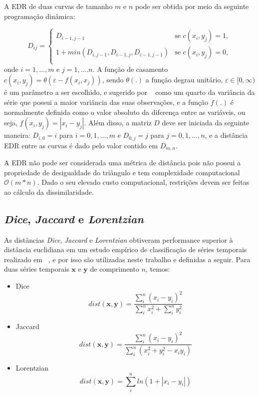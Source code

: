 A EDR de duas curvas de tamanho $m$ e $n$ pode ser obtida por meio da seguinte programação dinâmica:

\begin{equation}
D_{ij} = 
\begin{cases} 
D_{i-1,j-1} 											   & \text{se } c(x_i,y_j) = 1, \\
1 + min(D_{i,j-1},D_{i-1,j},D_{i-1,j-1})     & \text{se } c(x_i,y_j) = 0, \\
\end{cases}
\end{equation}
onde $i=1,...,m$ e $j=1,....n$. A função de casamento $c(x_i,y_j) = \theta (\varepsilon - f(x_i,x_j))$, sendo $\theta(.)$ a função degrau unitário, $\varepsilon \in [0,\infty)$ é um parâmetro a ser escolhido, e sugerido por ~\parencite{EDR} como um quarto da variância da série que possui a maior variância das suas observações, e a função $f(.)$ é normalmente definida como o valor absoluto da diferença entre as variáveis, ou seja, $f(x_i,y_j) = |x_i-y_j|$. Além disso, a matriz $D$ deve ser iniciada da seguinte maneira: $D_{i,0} = i$ para $i=0,1,...,m$ e $D_{0,j} =j$ para $j=0,1,...,n$, e a distância EDR entre as curvas é dado pelo valor contido em $D_{m,n}$.

A EDR não pode ser considerada uma métrica de distância pois não possui a propriedade de desigualdade do triângulo e tem complexidade computacional $\mathcal{O}(m*n)$. Dado o seu elevado custo computacional, restrições devem ser feitas ao cálculo da dissimilaridade.

\subsection{\emph{Dice}, \emph{Jaccard} e \emph{Lorentzian}}

As distâncias \emph{Dice}, \emph{Jaccard} e \emph{Lorentzian} obtiveram performance superior à distância euclidiana em um estudo empírico de classificação de séries temporais realizado em ~\parencite{BatistaComparativo}, e por isso são utilizadas neste trabalho e definidas a seguir. Para duas séries temporais $\bm{x}$ e $\bm{y}$ de comprimento $n$, temos:

\begin{itemize}
	\item Dice \begin{equation}
	dist(\bm{x}, \bm{y}) =\frac{\sum_{i}^{n}(x_i-y_i)^2}{\sum_{i}^{n}x_i^2 + \sum_{i}^{n} y_i^2}
	\end{equation}
		\item Jaccard \begin{equation}
		dist(\bm{x}, \bm{y}) =\frac{\sum_{i}^{n}(x_i-y_i)^2}{\sum_{i}^{n}(x_i^2 +y_i^2-x_i y_i)}
		\end{equation}
			\item Lorentzian \begin{equation}
			dist(\bm{x}, \bm{y}) = \sum_{i}^{n} ln(1 + |x_i-y_i|)
			\end{equation}
\end{itemize}

